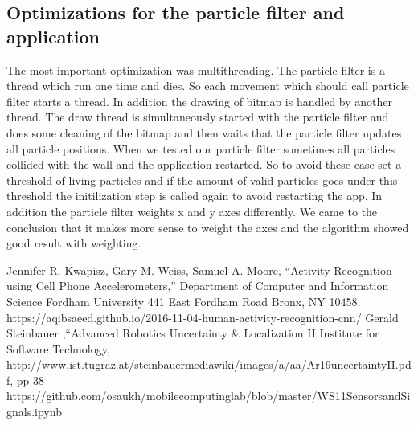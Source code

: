 \documentclass[conference]{IEEEtran}
\begin{document}
\subsection{Optimizations for the particle filter and application}
The most important optimization was multithreading. The particle filter is a thread which run one time and dies. So each movement which should call particle filter starts a thread.  In addition the drawing of bitmap is handled by another thread. The draw thread is simultaneously started with the particle filter and does some cleaning of the bitmap and then waits that the particle filter updates all particle positions. When we tested our particle filter sometimes all particles collided with the wall and the application restarted. So to avoid these case set a threshold of living particles and if the amount of valid particles goes under this threshold the initilization step is called again to avoid restarting the app. In addition the particle filter weights x and y axes differently. We came to the conclusion that it makes more sense to weight the axes and the algorithm showed good result with weighting.
\begin{thebibliography}{00}
 Jennifer R. Kwapisz, Gary M. Weiss, Samuel A. Moore, ``Activity Recognition using Cell Phone Accelerometers,''  Department of Computer and Information Science  Fordham University  441 East Fordham Road  Bronx, NY 10458.
https://aqibsaeed.github.io/2016-11-04-human-activity-recognition-cnn/
Gerald Steinbauer ,``Advanced Robotics Uncertainty \& Localization II Institute for Software Technology,\\
http://www.ist.tugraz.at/steinbauermediawiki/images/a/aa/Ar19uncertaintyII.pdf, pp 38
 https://github.com/osaukh/mobilecomputinglab/blob/master/WS11SensorsandSignals.ipynb
\end{thebibliography}
\vspace{12pt}
\end{document}
